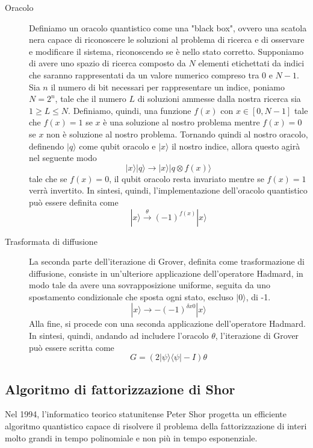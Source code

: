 \begin{description}
  \item[Oracolo] Definiamo un oracolo quantistico come una "black box", ovvero una scatola nera capace di riconoscere le soluzioni al problema di ricerca e di osservare e modificare il sistema, riconoscendo se è nello stato corretto. Supponiamo di avere uno spazio di ricerca composto da \(N\) elementi etichettati da indici che saranno rappresentati da un valore numerico compreso tra \(0\) e \(N - 1\). Sia \(n\) il numero di bit necessari per rappresentare un indice, poniamo \(N = 2^n\), tale che il numero \(L\) di soluzioni ammesse dalla nostra ricerca sia \(1 \geqslant L \leqslant N\). Definiamo, quindi, una funzione \(f(x)\) con \(x \in [0, N - 1]\) tale che \(f (x) = 1\) se \(x\) è una soluzione al nostro problema mentre \(f(x) = 0\) se \(x\) non è soluzione al nostro problema.
  Tornando quindi al nostro oracolo, definendo \(|q\rangle\) come qubit oracolo e \(|x\rangle\) il nostro indice, allora questo agirà nel seguente modo
  \[ |x\rangle |q\rangle \rightarrow |x\rangle |q \otimes f(x)\rangle \]
  tale che se \(f(x) = 0\), il qubit oracolo resta invariato mentre se \(f(x) = 1\) verrà invertito.
  In sintesi, quindi, l’implementazione dell’oracolo quantistico può essere definita come
  \[ |x\rangle \overset{\theta}{\rightarrow} (-1)^{f(x)} |x\rangle \]
  \item[Trasformata di diffusione] La seconda parte dell'iterazione di Grover, definita come trasformazione di diffusione, consiste in un'ulteriore applicazione dell'operatore Hadmard, in modo tale da avere una sovrapposizione uniforme, seguita da uno spostamento condizionale che sposta ogni stato, escluso \(|0\rangle\), di -1.
  \[ |x\rangle \rightarrow -(-1)^{\delta x 0} |x\rangle \]
  Alla fine, si procede con una seconda applicazione dell'operatore Hadmard. In sintesi, quindi, andando ad includere l'oracolo \(\theta\), l'iterazione di Grover può essere scritta come
  \[ G = (2 | \psi \rangle \langle \psi | - I) \theta \]
\end{description}

\subsection{Algoritmo di fattorizzazione di Shor}
Nel 1994, l'informatico teorico statunitense Peter Shor progetta un efficiente algoritmo quantistico capace di risolvere il problema della fattorizzazione di interi molto grandi in tempo polinomiale e non più in tempo esponenziale.

